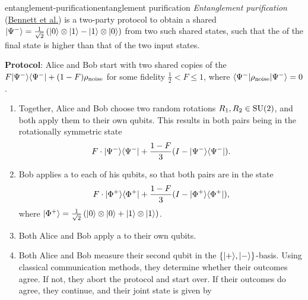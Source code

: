 \begin{topic}{entanglement-purification}{entanglement purification}
    \emph{Entanglement purification} (\href{https://arxiv.org/pdf/quant-ph/9511027}{Bennett et al.}) is a two-party protocol to obtain a shared  $|\Psi^-\rangle = \frac{1}{\sqrt{2}} \left( |0\rangle \otimes |1\rangle - |1\rangle \otimes |0\rangle \right)$ from two such shared states, such that the  of the final state is higher than that of the two input states.

    \textbf{Protocol}: Alice and Bob start with two shared copies of the  $F |\Psi^-\rangle \langle\Psi^-| + (1 - F) \rho_\textup{noise}$ for some fidelity $\frac{1}{2} < F \le 1$, where $\langle\Psi^-| \rho_\textup{noise} |\Psi^-\rangle = 0$.
    \begin{enumerate}[label=(\roman*)]
        \item Together, Alice and Bob choose two random rotations $R_1, R_2 \in \textup{SU}(2)$, and both apply them to their own qubits. This results in both pairs being in the rotationally symmetric state
        \[ F \cdot |\Psi^-\rangle \langle\Psi^-| + \frac{1 - F}{3} (I - |\Psi^-\rangle \langle\Psi^-|) . \]
        \item Bob applies a  to each of his qubits, so that both pairs are in the state
        \[ F \cdot |\Phi^+\rangle \langle\Phi^+| + \frac{1 - F}{3} (I - |\Phi^+\rangle \langle\Phi^+|) , \]
        where $|\Phi^+\rangle = \frac{1}{\sqrt{2}} \left( |0\rangle \otimes |0\rangle + |1\rangle \otimes |1\rangle \right)$.
        \item Both Alice and Bob apply a  to their own qubits.
        \item Both Alice and Bob measure their second qubit in the $\{ |+\rangle, |-\rangle \}$-basis. Using classical communication methods, they determine whether their outcomes agree. If not, they abort the protocol and start over. If their outcomes do agree, they continue, and their joint state is given by

\end{enumerate}
\end{topic}
